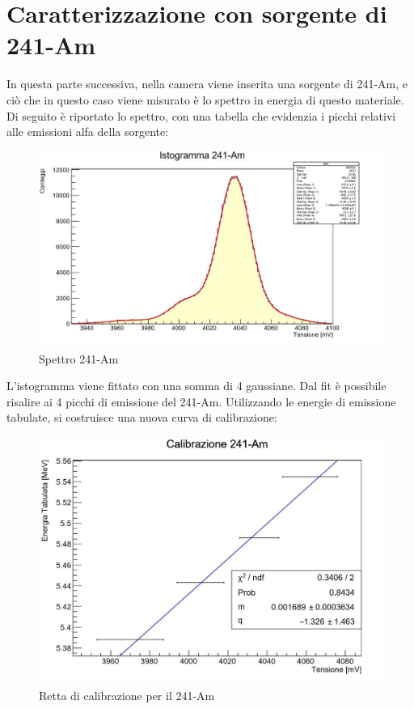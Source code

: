 \documentclass[a4paper,10pt]{article}
\begin{document}
\section{Caratterizzazione con sorgente di 241-Am}
In questa parte successiva, nella camera viene inserita una sorgente di 241-Am, e ci\`o che in questo caso viene misurato \`e lo spettro in energia di questo materiale. Di seguito \`e riportato lo spettro, con una tabella che evidenzia i picchi relativi alle emissioni alfa della sorgente:\\

\begin{figure}[h!]
\centering
\includegraphics[scale=0.5]{istoame.jpg}
\caption{Spettro 241-Am}
\end{figure}

L'istogramma viene fittato con una somma di 4 gaussiane. Dal fit \`e possibile risalire ai 4 picchi di emissione del 241-Am. Utilizzando le energie di emissione tabulate, si costruisce una nuova curva di calibrazione:\\

\begin{figure}[H]
\centering
\includegraphics[scale=0.5]{rettaame.jpg}
\caption{Retta di calibrazione per il 241-Am}
\end{figure}
\end{document}
